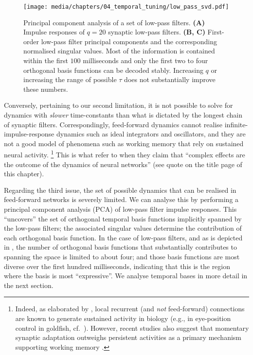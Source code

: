 \begin{figure}[p]
	\centering
	\texttt{[image: media/chapters/04\_temporal\_tuning/low\_pass\_svd.pdf]}
	\caption[Principal component analysis of a set of low-pass filters]{Principal component analysis of a set of low-pass filters. \textbf{(A)} Impulse responses of $q = 20$ synaptic low-pass filters. \textbf{(B, C)} First-order low-pass filter principal components and the corresponding normalised singular values. Most of the information is contained within the first $100$ milliseconds and only the first two to four orthogonal basis functions can be decoded stably. Increasing $q$ or increasing the range of possible $\tau$ does not substantially improve these numbers.}
	\label{fig:low_pass_svd}
\end{figure}

Conversely, pertaining to our second limitation, it is not possible to solve for dynamics with \emph{slower} time-constants than what is dictated by the longest chain of synaptic filters.
Correspondingly, feed-forward dynamics cannot realise infinite-impulse-response dynamics such as ideal integrators and oscillators, and they are not a good model of phenomena such as working memory that rely on sustained neural activity.%
\footnote{Indeed, as elaborated by \citet[Section~8.4.1]{eliasmith2003neural}, local recurrent (and \emph{not} feed-forward) connections are known to generate sustained activity in biology (e.g., in eye-position control in goldfish, cf.~\cite{aksay2001vivo}).
However, recent studies also suggest that momentary synaptic adaptation outweighs persistent activities as a primary mechanism supporting working memory \citep{lundqvist2018working}.}
This is what \citet[Chapter~1, p.~4]{churchland1992computational} refer to when they claim that \enquote{complex effects are the outcome of the dynamics of neural networks} (see quote on the title page of this chapter).

Regarding the third issue, the set of possible dynamics that can be realised in feed-forward networks is severely limited.
We can analyse this by performing a principal component analysis (PCA) of low-pass filter impulse responses.
This \enquote{uncovers} the set of orthogonal temporal basis functions implicitly spanned by the low-pass filters; the associated singular values determine the contribution of each orthogonal basis function.
In the case of low-pass filters, and as is depicted in , the number of orthogonal basis functions that  substantially contributes to spanning the space is limited to about four; and those basis functions are most diverse over the first hundred milliseconds, indicating that this is the region where the basis is most \enquote{expressive}.
We analyse temporal bases in more detail in the next section.

